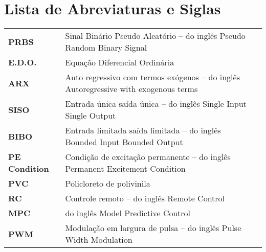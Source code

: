 
\chapter*{Lista de Abreviaturas e Siglas}

\begin{longtable}{lL{14cm}L{\textwidth}}

\textbf{PRBS}  & Sinal Binário Pseudo Aleatório -- do inglês Pseudo Random Binary Signal & \\

\textbf{E.D.O.}  & Equação Diferencial Ordinária & \\

\textbf{ARX}  & Auto regressivo com termos exógenos -- do inglês Autoregressive with exogenous terms & \\

\textbf{SISO}  & Entrada única saída única -- do inglês Single Input Single Output & \\

\textbf{BIBO}  & Entrada limitada saída limitada -- do inglês Bounded Input Bounded Output & \\

\textbf{PE Condition}  & Condição de excitação permanente -- do inglês Permanent Excitement Condition & \\

\textbf{PVC}  & Policloreto de polivinila& \\

\textbf{RC}  & Controle remoto -- do inglês Remote Control & \\
\textbf{MPC} & do inglês Model Predictive Control &\\

\textbf{PWM} & Modulação em largura de pulsa -- do inglês Pulse Width Modulation & \\

\end{longtable}
